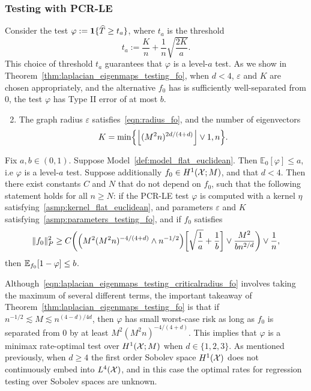 \subsubsection{Testing with PCR-LE} 
Consider the test $\varphi := \mathbf{1}\{\widehat{T} \geq t_{a}\}$, where $t_{a}$ is the threshold
\begin{equation*}
t_{a} := \frac{K}{n} + \frac{1}{n}\sqrt{\frac{2K}{a}}.
\end{equation*}
This choice of threshold $t_{a}$ guarantees that $\varphi$ is a level-$a$ test. As we show in Theorem~\ref{thm:laplacian_eigenmaps_testing_fo}, when $d < 4$, $\varepsilon$ and $K$ are chosen appropriately, and the alternative $f_0$ has is sufficiently well-separated from $0$, the test $\varphi$ has Type II error of at most $b$.

\begin{enumerate}[label=(P\arabic*)]
	\setcounter{enumi}{1}
	\item 
	\label{asmp:parameters_testing_fo}
	The graph radius $\varepsilon$ satisfies~\eqref{eqn:radius_fo}, and the number of eigenvectors 
	\begin{equation}
	\label{eqn:eigenvector_testing_fo}
	K = \min\Bigl\{\left\lfloor (M^2n)^{2d/(4 + d)} \right\rfloor \vee 1, n\Bigr\}.
	\end{equation}
\end{enumerate}
\begin{theorem}
	\label{thm:laplacian_eigenmaps_testing_fo}
	Fix $a,b \in (0,1)$. Suppose Model~\ref{def:model_flat_euclidean}. Then $\mathbb{E}_0[\varphi] \leq a$, i.e $\varphi$ is a level-$a$ test. Suppose additionally $f_0 \in H^1(\mathcal{X};M)$, and that $d < 4$. Then there exist constants $C$ and $N$ that do not depend on $f_0$, such that the following statement holds for all $n \geq N$: if the PCR-LE test $\varphi$ is computed with a kernel $\eta$ satisfying~\ref{asmp:kernel_flat_euclidean}, and parameters $\varepsilon$ and $K$ satisfying~\ref{asmp:parameters_testing_fo}, and if $f_0$ satisfies
	\begin{equation}
	\label{eqn:laplacian_eigenmaps_testing_criticalradius_fo}
	\|f_0\|_P^2 \geq C\biggl(\Bigl(M^2(M^2n)^{-4/(4 + d) } \wedge n^{-1/2}\Bigr)\biggl[\sqrt{\frac{1}{a}} + \frac{1}{b}\biggr] \vee \frac{M^2}{b n^{2/d}} \biggr) \vee \frac{1}{n},
	\end{equation}
	then $\mathbb{E}_{f_0}[1 - \varphi] \leq b$.
\end{theorem}
Although~\eqref{eqn:laplacian_eigenmaps_testing_criticalradius_fo} involves taking the maximum of several different terms, the important takeaway of Theorem~\ref{thm:laplacian_eigenmaps_testing_fo} is that if $n^{-1/2} \lesssim M \lesssim n^{(4 - d)/4d}$, then $\varphi$ has small worst-case risk as long as $f_0$ is separated from $0$ by at least $M^2(M^2n)^{-4/(4 + d)}$. This implies that $\varphi$ is a minimax rate-optimal test over $H^1(\mathcal{X};M)$ when $d \in \{1,2,3\}$. As mentioned previously, when $d \geq 4$ the first order Sobolev space $H^1(\mathcal{X})$ does not continuously embed into $L^4(\mathcal{X})$, and in this case the optimal rates for regression testing over Sobolev spaces are unknown.

